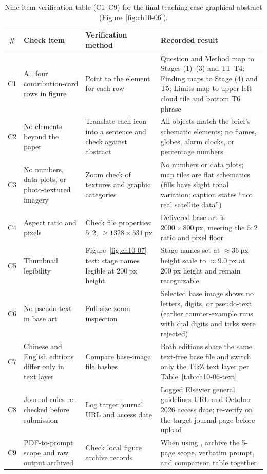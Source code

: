 \begin{table}[htbp]\centering\footnotesize
\setlength{\tabcolsep}{3pt}
\renewcommand{\arraystretch}{1.15}
\caption{Nine-item verification table (C1--C9) for the final teaching-case graphical abstract (Figure~\ref{fig:ch10-06}).}\label{tab:ch10-07-verify}
\begin{tabularx}{\linewidth}{@{}c>{\raggedright\arraybackslash}p{26mm}>{\raggedright\arraybackslash}p{32mm}Y@{}}
\toprule
\textbf{\#} & \textbf{Check item} & \textbf{Verification method} & \textbf{Recorded result} \\
\midrule
C1 & All four contribution-card rows in figure & Point to the element for each row & Question and Method map to Stages (1)--(3) and T1--T4; Finding maps to Stage (4) and T5; Limits map to upper-left cloud tile and bottom T6 phrase \\
C2 & No elements beyond the paper & Translate each icon into a sentence and check against abstract & All objects match the brief's schematic elements; no flames, globes, alarm clocks, or percentage numbers \\
C3 & No numbers, data plots, or photo-textured imagery & Zoom check of textures and graphic categories & No numbers or data plots; map tiles are flat schematics (fills have slight tonal variation; caption states ``not real satellite data'') \\
C4 & Aspect ratio and pixels & Check file properties: $5:2$, $\ge 1328 \times 531\ \text{px}$ & Delivered base art is $2000 \times 800\ \text{px}$, meeting the $5:2$ ratio and pixel floor \\
C5 & Thumbnail legibility & Figure~\ref{fig:ch10-07} test: stage names legible at $200\ \text{px}$ height & Stage names set at $\approx 36\ \text{px}$ height scale to $\approx 9.0\ \text{px}$ at $200\ \text{px}$ height and remain recognizable \\
C6 & No pseudo-text in base art & Full-size zoom inspection & Selected base image shows no letters, digits, or pseudo-text (earlier counter-example runs with dial digits and ticks were rejected) \\
C7 & Chinese and English editions differ only in text layer & Compare base-image file hashes & Both editions share the same text-free base file and switch only the TikZ text layer per Table~\ref{tab:ch10-06-text} \\
C8 & Journal rules re-checked before submission & Log target journal URL and access date & Logged Elsevier general guidelines URL and October 2026 access date; re-verify on the target journal page before upload \\
C9 & PDF-to-prompt scope and raw output archived & Check local figure archive records & When using , archive the 5-page scope, verbatim prompt, and comparison table together \\
\bottomrule
\end{tabularx}
\end{table}


